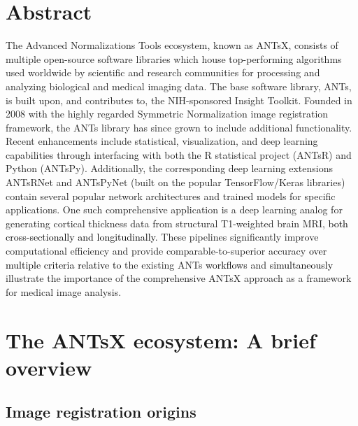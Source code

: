 \documentclass[
  12pt,
]{article}
\begin{document}
\normalsize

\newpage


\hypertarget{abstract}{%
\section*{Abstract}\label{abstract}}

The Advanced Normalizations Tools ecosystem, known as ANTsX, consists of
multiple open-source software libraries which house top-performing
algorithms used worldwide by scientific and research communities for
processing and analyzing biological and medical imaging data. The base
software library, ANTs, is built upon, and contributes to, the
NIH-sponsored Insight Toolkit. Founded in 2008 with the highly regarded
Symmetric Normalization image registration framework, the ANTs library
has since grown to include additional functionality. Recent enhancements
include statistical, visualization, and deep learning capabilities
through interfacing with both the R statistical project (ANTsR) and
Python (ANTsPy). Additionally, the corresponding deep learning
extensions ANTsRNet and ANTsPyNet (built on the popular TensorFlow/Keras
libraries) contain several popular network architectures and trained
models for specific applications. One such comprehensive application is
a deep learning analog for generating cortical thickness data from
structural T1-weighted brain MRI,
\textcolor{black}{both cross-sectionally and longitudinally}. These
pipelines significantly improve computational efficiency and provide
comparable-to-superior accuracy
\textcolor{black}{over multiple criteria relative
to} the existing ANTs \textcolor{black}{workflows} and
\textcolor{black}{simultaneously} illustrate the importance of the
comprehensive ANTsX approach as a framework for medical image analysis.

\newpage

\hypertarget{the-antsx-ecosystem-a-brief-overview}{%
\section*{The ANTsX ecosystem: A brief
overview}\label{the-antsx-ecosystem-a-brief-overview}}

\hypertarget{image-registration-origins}{%
\subsection*{Image registration
origins}\label{image-registration-origins}}
\end{document}
